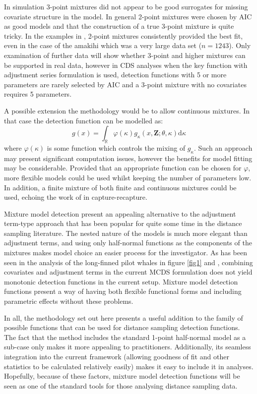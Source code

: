In simulation 3-point mixtures did not appear to be good surrogates for missing covariate structure in the model. In general 2-point mixtures were chosen by AIC as good models and that the construction of a true 3-point mixture is quite tricky. In the examples in , 2-point mixtures consistently provided the best fit, even in the case of the amakihi which was a very large data set ($n=1243$). Only examination of further data will show whether 3-point and higher mixtures can be supported in real data, however in CDS analyses when the key function with adjustment series formulation is used, detection functions with 5 or more parameters are rarely selected by AIC and a 3-point mixture with no covariates requires 5 parameters.

A possible extension the methodology would be to allow continuous mixtures. In that case the detection function can be modelled as:
\begin{equation*}
g(x) = \int_\mathbb{R} \varphi(\kappa) g_\kappa(x,\mathbf{Z}; \theta, \kappa) \text{d}\kappa
\end{equation*}
where $\varphi(\kappa)$ is some function which controls the mixing of $g_\kappa$. Such an approach may present significant computation issues, however the benefits for model fitting may be considerable. Provided that an appropriate function can be chosen for $\varphi$, more flexible models could be used whilst keeping the number of parameters low. In addition, a finite mixture of both finite and continuous mixtures could be used, echoing the work of  in capture-recapture.

Mixture model detection present an appealing alternative to the adjustment term-type approach that has been popular for quite some time in the distance sampling literature. The nested nature of the models is much more elegant than adjustment terms, and using only half-normal functions as the components of the mixtures makes model choice an easier process for the investigator. As has been seen in the analysis of the long-finned pilot whales in figure \ref{fig1} and , combining covariates and adjustment terms in the current MCDS formulation does not yield monotonic detection functions in the current setup. Mixture model detection functions present a way of having both flexible functional forms and including parametric effects without these problems.

In all, the methodology set out here presents a useful addition to the family of possible functions that can be used for distance sampling detection functions. The fact that the method includes the standard 1-point half-normal model as a sub-case only makes it more appealing to practitioners. Additionally, its seamless integration into the current framework (allowing goodness of fit and other statistics to be calculated relatively easily) makes it easy to include it in analyses. Hopefully, because of these factors, mixture model detection functions will be seen as one of the standard tools for those analysing distance sampling data.


